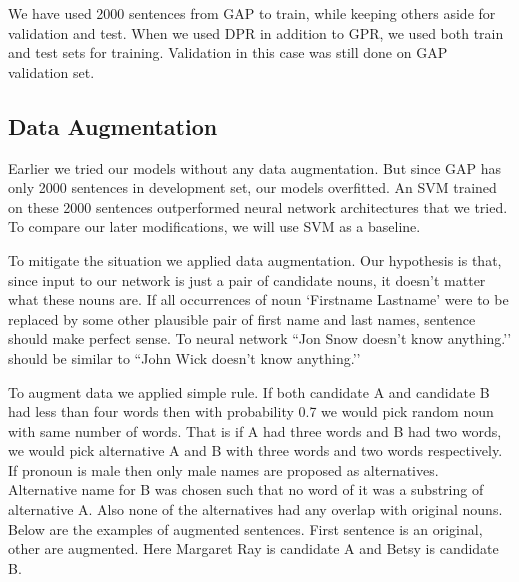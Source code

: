 \documentclass[11pt,a4paper]{article}
\begin{document}
We have used 2000 sentences from GAP to train, while keeping others aside for validation and test. When we used DPR in addition to GPR, we used both train and test sets for training. Validation in this case was still done on GAP validation set.

\subsection{Data Augmentation}

Earlier we tried our models without any data augmentation. But since GAP has only 2000 sentences in development set, our models overfitted. An SVM trained on these 2000 sentences outperformed neural network architectures that we tried. To compare our later modifications, we will use SVM as a baseline.

To mitigate the situation we applied data augmentation. Our hypothesis is that, since input to our network is just a pair of candidate nouns, it doesn’t matter what these nouns are. If all occurrences of noun `Firstname Lastname’ were to be replaced by some other plausible pair of first name and last names, sentence should make perfect sense. To neural network ``Jon Snow doesn’t know anything.’’ should be similar to ``John Wick doesn’t know anything.’’ 

To augment data we applied simple rule. If both candidate A and candidate B had less than four words then with probability 0.7 we would pick random noun with same number of words. That is if A had three words and B had two words, we would pick alternative A and B with three words and two words respectively. If pronoun is male then only male names are proposed as alternatives. Alternative name for B was chosen such that no word of it was a substring of alternative A. Also none of the alternatives had any overlap with original nouns. Below are the examples of augmented sentences. First sentence is an original, other are augmented. Here Margaret Ray is candidate A and Betsy is candidate B.
\end{document}
